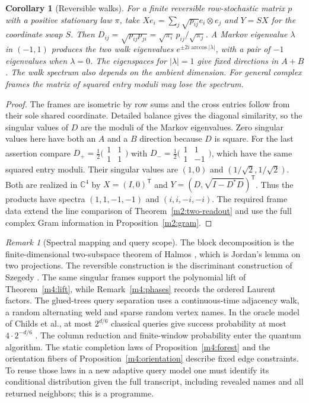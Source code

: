 \documentclass[11pt,reqno]{amsart}
\newtheorem{corollary}[theorem]{Corollary}
\theoremstyle{definition}
\theoremstyle{remark}
\newtheorem{remark}[theorem]{Remark}
\numberwithin{equation}{section}
\begin{document}
\begin{corollary}[Reversible walks]\label{m11:graph-walk}
For a finite reversible row-stochastic matrix $p$ with a positive
stationary law $\pi$, take $Xe_i=\sum_j\sqrt{p_{ij}}e_i\otimes e_j$
and $Y=SX$ for the coordinate swap $S$. Then
$D_{ij}=\sqrt{p_{ij}p_{ji}}=\sqrt{\pi_i}\,p_{ij}/\sqrt{\pi_j}$.
A Markov eigenvalue $\lambda$ in $(-1,1)$ produces the two walk
eigenvalues $e^{\pm2i\arccos|\lambda|}$, with a pair of $-1$ eigenvalues
when $\lambda=0$. The eigenspaces for $|\lambda|=1$ give fixed directions
in $A+B$. The walk spectrum also depends on the ambient dimension.
For general complex frames the matrix of squared entry moduli may
lose the spectrum.
\end{corollary}
\begin{proof}
The frames are isometric by row sums and the cross entries follow
from their sole shared coordinate. Detailed balance gives the
diagonal similarity, so the singular values of $D$ are the moduli of the
Markov eigenvalues. Zero singular values here have both an $A$ and
a $B$ direction because $D$ is square. For the last assertion compare
$D_+=\frac12\bigl(\begin{smallmatrix}1&1\\1&1\end{smallmatrix}\bigr)$ with
$D_-=\frac12\bigl(\begin{smallmatrix}1&1\\1&-1\end{smallmatrix}\bigr)$,
which have the same squared entry moduli.
Their singular values are $(1,0)$ and $(1/\sqrt2,1/\sqrt2)$.
Both are realized in $\mathbb C^4$ by $X=(I,0)^{\mathsf T}$ and
$Y=(D,\sqrt{I-D^*D})^{\mathsf T}$. Thus the products have spectra
$(1,1,-1,-1)$ and $(i,i,-i,-i)$. The required frame data extend
the line comparison of Theorem~\ref{m2:two-readout} and use the
full complex Gram information in Proposition~\ref{m2:gram}.
\end{proof}

\begin{remark}[Spectral mapping and query scope]\label{m11:walk-literature}
The block decomposition is the finite-dimensional two-subspace theorem
of Halmos \cite[Thm.~2]{m11:Halmos}, which is Jordan's lemma on two
projections. The reversible construction is the discriminant
construction of Szegedy \cite{m11:Szegedy}. The same singular
frames support the polynomial lift of Theorem~\ref{m4:lift},
while Remark~\ref{m4:phases} records the ordered Laurent factors.
The glued-trees query separation uses a continuous-time adjacency walk,
a random alternating weld and sparse random vertex names.
In the oracle model of Childs et al., at most $2^{d/6}$ classical
queries give success probability at most $4\cdot2^{-d/6}$
\cite[Theorem~9, arXiv v2]{m4:Childs}. The column reduction and
finite-window probability enter the quantum algorithm. The static
completion laws of Proposition~\ref{m4:forest} and the orientation
fibers of Proposition~\ref{m4:orientation} describe fixed edge
constraints. To reuse those laws in a new adaptive query model one must
identify its conditional distribution given the full transcript,
including revealed names and all returned neighbors; this is a programme.
\end{remark}
\end{document}
